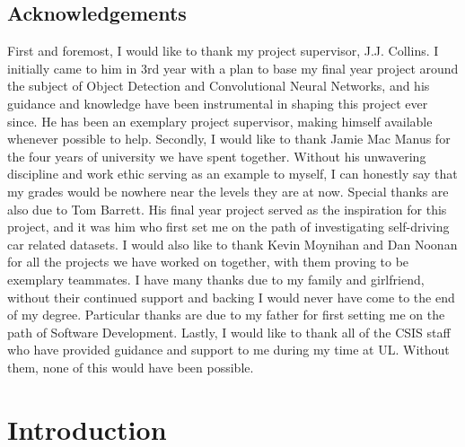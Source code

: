 \documentclass[12pt]{report}
\begin{document}
\section*{Acknowledgements}
\begin{flushleft}
First and foremost, I would like to thank my project supervisor, J.J. Collins. I initially came to him in 3rd year with a plan to base my final year project around the subject of Object Detection and Convolutional Neural Networks, and his guidance and knowledge have been instrumental in shaping this project ever since. He has been an exemplary project supervisor, making himself available whenever possible to help.
\linebreak
\linebreak
Secondly, I would like to thank Jamie Mac Manus for the four years of university we have spent together. Without his unwavering discipline and work ethic serving as an example to myself, I can honestly say that my grades would be nowhere near the levels they are at now.
\linebreak
\linebreak
Special thanks are also due to Tom Barrett. His final year project served as the inspiration for this project, and it was him who first set me on the path of investigating self-driving car related datasets.
\linebreak
\linebreak
I would also like to thank Kevin Moynihan and Dan Noonan for all the projects we have worked on together, with them proving to be exemplary teammates.
\linebreak
\linebreak
I have many thanks due to my family and girlfriend, without their continued support and backing I would never have come to the end of my degree. Particular thanks are due to my father for first setting me on the path of Software Development.
\linebreak
\linebreak
Lastly, I would like to thank all of the CSIS staff who have provided guidance and support to me during my time at UL. Without them, none of this would have been possible.
\end{flushleft}
\clearpage
 
\tableofcontents
\listoffigures
\listoftables

\clearpage

\chapter{Introduction}
\end{document}
